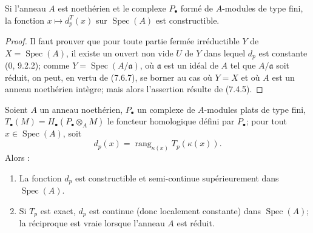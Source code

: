 \begin{lemma}[7.6.8]
Si l'anneau $A$ est noethérien et le complexe $P_\bullet$ formé de $A$-modules
de type fini, la fonction $x\mapsto d_p^T(x)$ sur $\operatorname{Spec}(A)$ est
constructible.
\end{lemma}

\begin{proof}
Il faut prouver que pour toute partie fermée irréductible $Y$ de
$X=\operatorname{Spec}(A)$, il existe un ouvert non vide $U$ de $Y$ dans lequel
$d_p$ est constante ($0$, 9.2.2); comme
$Y=\operatorname{Spec}(A/\mathfrak a)$, où $\mathfrak a$ est un idéal de $A$ tel
que $A/\mathfrak a$ soit réduit, on peut, en vertu de (7.6.7), se borner au cas
où $Y=X$ et où $A$ est un anneau noethérien intègre; mais alors l'assertion
résulte de (7.4.5).
\end{proof}

\begin{theorem}[7.6.9]
Soient $A$ un anneau noethérien, $P_\bullet$ un complexe de $A$-modules plats de
type fini, $T_\bullet(M)=H_\bullet(P_\bullet\otimes_A M)$ le foncteur homologique
défini par $P_\bullet$; pour tout $x\in\operatorname{Spec}(A)$, soit
\[
  d_p(x)=\operatorname{rang}_{\kappa(x)}T_p(\kappa(x)).
\]
Alors :
\begin{enumerate}
  \item[(i)] La fonction $d_p$ est constructible et semi-continue
    supérieurement dans $\operatorname{Spec}(A)$.
  \item[(ii)] Si $T_p$ est exact, $d_p$ est continue (donc localement constante)
    dans $\operatorname{Spec}(A)$; la réciproque est vraie lorsque l'anneau $A$
    est réduit.
\end{enumerate}
\end{theorem}

